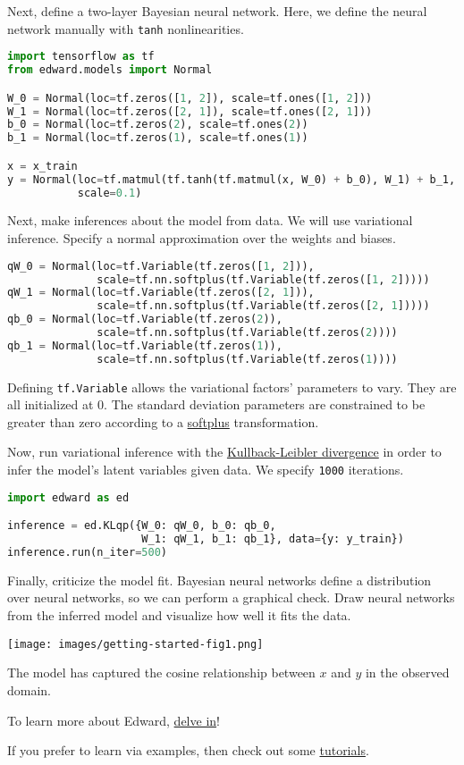 Next, define a two-layer Bayesian neural network. Here, we
define the neural network manually with \texttt{tanh} nonlinearities.

\begin{lstlisting}[language=Python]
import tensorflow as tf
from edward.models import Normal

W_0 = Normal(loc=tf.zeros([1, 2]), scale=tf.ones([1, 2]))
W_1 = Normal(loc=tf.zeros([2, 1]), scale=tf.ones([2, 1]))
b_0 = Normal(loc=tf.zeros(2), scale=tf.ones(2))
b_1 = Normal(loc=tf.zeros(1), scale=tf.ones(1))

x = x_train
y = Normal(loc=tf.matmul(tf.tanh(tf.matmul(x, W_0) + b_0), W_1) + b_1,
           scale=0.1)
\end{lstlisting}

Next, make inferences about the model from data. We will use variational
inference. Specify a normal approximation over the weights and biases.

\begin{lstlisting}[language=Python]
qW_0 = Normal(loc=tf.Variable(tf.zeros([1, 2])),
              scale=tf.nn.softplus(tf.Variable(tf.zeros([1, 2]))))
qW_1 = Normal(loc=tf.Variable(tf.zeros([2, 1])),
              scale=tf.nn.softplus(tf.Variable(tf.zeros([2, 1]))))
qb_0 = Normal(loc=tf.Variable(tf.zeros(2)),
              scale=tf.nn.softplus(tf.Variable(tf.zeros(2))))
qb_1 = Normal(loc=tf.Variable(tf.zeros(1)),
              scale=tf.nn.softplus(tf.Variable(tf.zeros(1))))
\end{lstlisting}

Defining \texttt{tf.Variable} allows the variational factors'
parameters to vary. They are all initialized at 0. The standard
deviation parameters are constrained to be greater than zero according
to a
\href{https://en.wikipedia.org/wiki/Rectifier_(neural_networks)}{softplus}
transformation.

Now, run variational inference with the
\href{https://en.wikipedia.org/wiki/Kullback–Leibler_divergence}{Kullback-Leibler divergence}
in order to infer the model's latent variables given data.
We specify \texttt{1000} iterations.

\begin{lstlisting}[language=Python]
import edward as ed

inference = ed.KLqp({W_0: qW_0, b_0: qb_0,
                     W_1: qW_1, b_1: qb_1}, data={y: y_train})
inference.run(n_iter=500)
\end{lstlisting}

Finally, criticize the model fit. Bayesian neural networks define a distribution
over neural networks, so we can perform a graphical check. Draw neural networks
from the inferred model and visualize how well it fits the data.

\texttt{[image: images/getting-started-fig1.png]}

The model has captured the cosine relationship between $x$ and $y$
in the observed domain.

To learn more about Edward, \href{/api}{delve in}!

If you prefer to learn via examples, then check out some
\href{/tutorials/}{tutorials}.
